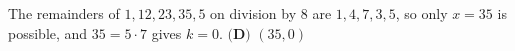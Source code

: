 The remainders of \(1,12,23,35,5\) on division by \(8\) are \(1,4,7,3,5\), so only \(x=35\) is possible, and \(35=5\cdot 7\) gives \(k=0\). \(\boxed{\textbf{(D) } (35,0)}\)
